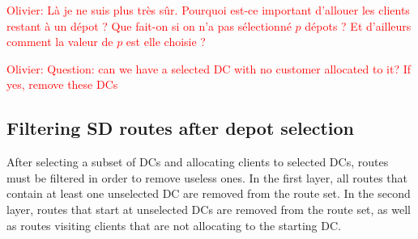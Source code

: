 \documentclass[a4paper,10pt]{article}
\begin{document}
\begin{linenumbers}
\textcolor{red}{Olivier: Là je ne suis plus très sûr. Pourquoi est-ce important d'allouer les clients restant à un dépot ? Que fait-on si on n'a pas sélectionné $p$ dépots ? Et d'ailleurs comment la valeur de $p$ est elle choisie ? }

\textcolor{red}{Olivier: Question: can we have a selected DC with no customer allocated to it? If yes, remove these DCs}


\newpage

\subsection{Filtering SD routes after depot selection}

After selecting a subset of DCs and allocating clients to selected DCs, routes must be filtered in order to remove useless ones. 
In the first layer, all routes that contain at least one unselected DC are removed from the route set. 
In the second layer, routes that start at unselected DCs are removed from the route set, as well as routes visiting clients that are not allocating to the starting DC. 


%
%		
%		
%
%
%
%
%		
%				




\end{linenumbers}
\end{document}
